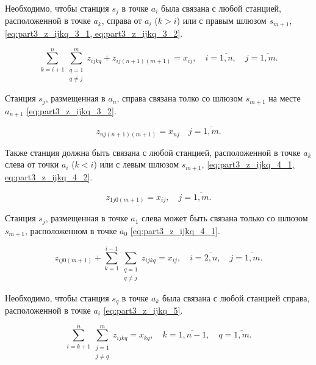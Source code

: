 Необходимо, чтобы станция $ s_j $ в точке $ a_i $ была связана с  любой станцией, расположенной в точке $ a_k $, справа от $ a_i $ ($ k> i $) или с правым шлюзом $ s_{m + 1} $, \cref{eq:part3_z_ijkq_3_1, eq:part3_z_ijkq_3_2}. 

\begin{equation}
  \label{eq:part3_z_ijkq_3_1}
  \sum\limits_{k=i+1}^{n} \sum\limits_{\substack{q = 1\\ q \neq j}}^m z_{ijkq} + z_{ij(n+1)(m+1)} = x_{ij} ,  \quad i = \overline{1, n}, \quad j = \overline{1, m}.
\end{equation}

Станция $ s_j $, размещенная в $ a_{n} $, справа связана толко со шлюзом $ s_{m + 1} $ на месте $ a_ {n+1}$ \cref{eq:part3_z_ijkq_3_2}. 


\begin{equation}
  \label{eq:part3_z_ijkq_3_2}
  z_{nj(n+1)(m+1)} = x_{nj} \quad j = \overline{1, m}.
\end{equation}

Также станция должна быть связана с любой станцией, расположенной в точке $ a_k $ слева от точки $ a_i $ ($ k <i $) или с левым шлюзом $ s_{m + 1} $, \cref{eq:part3_z_ijkq_4_1, eq:part3_z_ijkq_4_2}.

\begin{equation}
  \label{eq:part3_z_ijkq_4_1}
  z_{1j0(m+1)}= x_{ij}, \quad j = \overline{1, m}.
\end{equation}

Станция $s_j$, размещенная в точке $a_{1}$ слева может быть связана только со шлюзом $s_{m+1}$, расположенном в точке $a_0$ \cref{eq:part3_z_ijkq_4_1}.

\begin{equation}
  \label{eq:part3_z_ijkq_4_2}
  z_{ij0(m+1)} + \sum\limits_{k=1}^{i-1} \sum\limits_{\substack{q = 1\\ q \neq j}} z_{ijkq}= x_{ij}, \quad i = \overline{2, n}, \quad j = \overline{1, m}.
\end{equation}

Необходимо, чтобы станция $ s_q $ в точке $ a_k $ была связана с любой станцией справа, расположенной в точке $ a_i $ \cref{eq:part3_z_ijkq_5}.

\begin{equation}
  \label{eq:part3_z_ijkq_5}
  \sum\limits_{i=k+1}^{n} \sum\limits_{\substack{j=1 \\ j \neq q}}^m z_{ijkq} = x_{kq} , \quad k = \overline{1, n-1}, \quad q = \overline{1, m}.
\end{equation}

